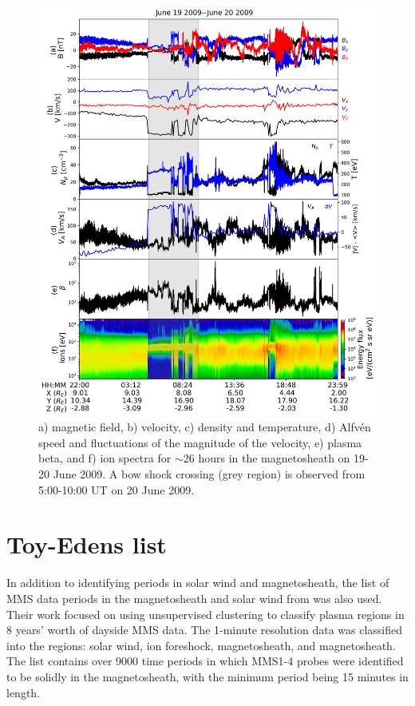\begin{figure}
    \centering
    \includegraphics[width=\textwidth]{Figures/Time series/timeseries_19062009_THMC.png}
    \caption[Time series data for THM-C on 19-20 June 2009]{a) magnetic field, b) velocity, c) density and temperature, d) Alfv\'en speed and fluctuations of the magnitude of the velocity, e) plasma beta, and f) ion spectra for $\sim$26 hours in the magnetosheath on 19-20 June 2009. A bow shock crossing (grey region) is observed from 5:00-10:00 UT on 20 June 2009.}
    \label{fig:timeseries-THM-magnetosheath}
\end{figure}


\section{Toy-Edens list}
In addition to identifying periods in solar wind and magnetosheath, the list of MMS data periods in the magnetosheath and solar wind from \cite{ToyEdens:2024} was also used. Their work focused on using unsupervised clustering to classify plasma regions in 8 years' worth of dayside MMS data. The 1-minute resolution data was classified into the regions: solar wind, ion foreshock, magnetosheath, and magnetosheath. The \cite{ToyEdens:2024} list contains over 9000 time periods in which MMS1-4 probes were identified to be solidly in the magnetosheath, with the minimum period being 15 minutes in length. 

